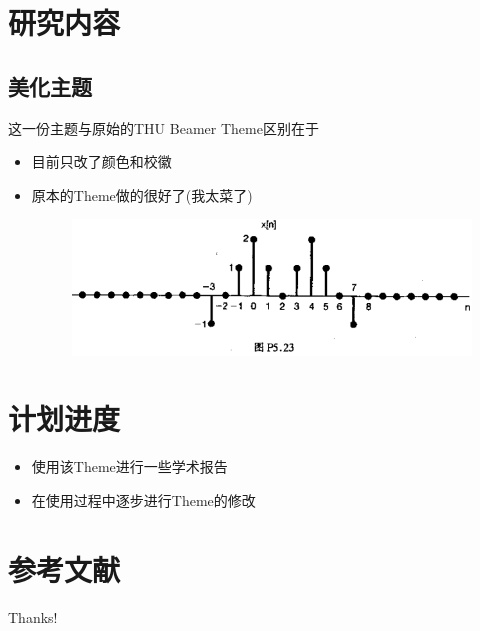 \documentclass{beamer}
\begin{document}
\section{研究内容}

\subsection{美化主题}

\begin{frame}{这一份主题与原始的THU Beamer Theme区别在于}
\begin{itemize}
\item 目前只改了颜色和校徽
\item 原本的Theme做的很好了(我太菜了)	
\begin{figure}[htpb]
	\begin{center}
		\includegraphics[width=0.9\linewidth]{pic/1.png}
	\end{center}
\end{figure}
\end{itemize}
\end{frame}

\section{计划进度}
\begin{frame}
	\begin{itemize}
\item 使用该Theme进行一些学术报告
\item 在使用过程中逐步进行Theme的修改
	\end{itemize}
\end{frame}

\section{参考文献}

\begin{frame}[allowframebreaks]


\end{frame}

\begin{frame}
\begin{center}
{\Huge Thanks!}
\end{center}
\end{frame}
\end{document}
